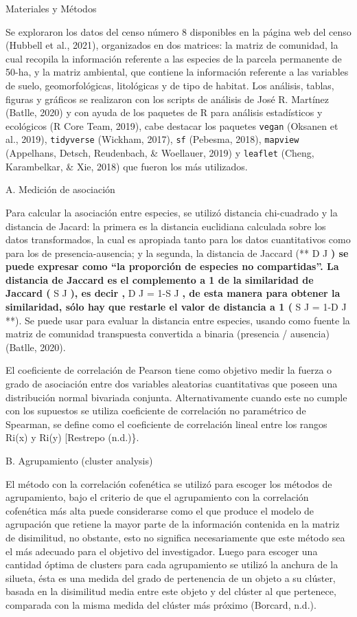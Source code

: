\documentclass[11pt,]{article}
\begin{document}
Materiales y Métodos

Se exploraron los datos del censo número 8 disponibles en la página web
del censo (Hubbell et al., 2021), organizados en dos matrices: la matriz
de comunidad, la cual recopila la información referente a las especies
de la parcela permanente de 50-ha, y la matriz ambiental, que contiene
la información referente a las variables de suelo, geomorfológicas,
litológicas y de tipo de habitat. Los análisis, tablas, figuras y
gráficos se realizaron con los scripts de análisis de José R. Martínez
(Batlle, 2020) y con ayuda de los paquetes de R para análisis
estadísticos y ecológicos (R Core Team, 2019), cabe destacar los
paquetes \texttt{vegan} (Oksanen et al., 2019), \texttt{tidyverse}
(Wickham, 2017), \texttt{sf} (Pebesma, 2018), \texttt{mapview}
(Appelhans, Detsch, Reudenbach, \& Woellauer, 2019) y \texttt{leaflet}
(Cheng, Karambelkar, \& Xie, 2018) que fueron los más utilizados.

A. Medición de asociación

Para calcular la asociación entre especies, se utilizó distancia
chi-cuadrado y la distancia de Jacard: la primera es la distancia
euclidiana calculada sobre los datos transformados, la cual es apropiada
tanto para los datos cuantitativos como para los de presencia-ausencia;
y la segunda, la distancia de Jaccard (** D J \textbf{) se puede
expresar como ``la proporción de especies no compartidas''. La distancia
de Jaccard es el complemento a 1 de la similaridad de Jaccard (} S J
\textbf{), es decir , } D J = 1-S J \textbf{, de esta manera para
obtener la similaridad, sólo hay que restarle el valor de distancia a 1
(} S J = 1-D J **). Se puede usar para evaluar la distancia entre
especies, usando como fuente la matriz de comunidad transpuesta
convertida a binaria (presencia / ausencia) (Batlle, 2020).

El coeficiente de correlación de Pearson tiene como objetivo medir la
fuerza o grado de asociación entre dos variables aleatorias
cuantitativas que poseen una distribución normal bivariada conjunta.
Alternativamente cuando este no cumple con los supuestos se utiliza
coeficiente de correlación no paramétrico de Spearman, se define como el
coeficiente de correlación lineal entre los rangos Ri(x) y Ri(y)
{[}Restrepo (n.d.)\}.

B. Agrupamiento (cluster analysis)

El método con la correlación cofenética se utilizó para escoger los
métodos de agrupamiento, bajo el criterio de que el agrupamiento con la
correlación cofenética más alta puede considerarse como el que produce
el modelo de agrupación que retiene la mayor parte de la información
contenida en la matriz de disimilitud, no obstante, esto no significa
necesariamente que este método sea el más adecuado para el objetivo del
investigador. Luego para escoger una cantidad óptima de clusters para
cada agrupamiento se utilizó la anchura de la silueta, ésta es una
medida del grado de pertenencia de un objeto a su clúster, basada en la
disimilitud media entre este objeto y del clúster al que pertenece,
comparada con la misma medida del clúster más próximo (Borcard, n.d.).
\end{document}

